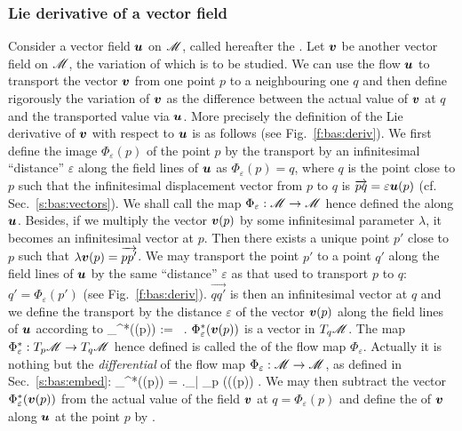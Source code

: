 \subsubsection{Lie derivative of a vector field} \label{s:bas:Lie_der_vector}

Consider a vector field $\bm{u}$ on $\mathscr{M}$, called hereafter the .
Let $\bm{v}$ be another vector field on $\mathscr{M}$, the variation of which is to be studied.
We can use the flow $\bm{u}$ to transport the vector $\bm{v}$ from one point $p$ to
a neighbouring one $q$ and then define rigorously the variation of $\bm{v}$
as the difference between the actual value of $\bm{v}$ at $q$ and the transported
value via $\bm{u}$. More precisely the definition of the Lie derivative of
$\bm{v}$ with respect to $\bm{u}$ is as follows (see Fig.~\ref{f:bas:deriv}).
We first define the image $\Phi_\varepsilon(p)$ of the point $p$ by the transport by an infinitesimal ``distance'' $\varepsilon$ along the field lines of $\bm{u}$ as
$\Phi_\varepsilon(p)=q$, where $q$ is the point close to $p$ such that
the infinitesimal displacement vector from $p$ to $q$ is
$\overrightarrow{pq}=\varepsilon\bm{u}(p)$ (cf. Sec.~\ref{s:bas:vectors}).
We shall call the map $\Phi_\varepsilon:\mathscr{M}\rightarrow \mathscr{M}$ hence defined
the  along $\bm{u}$.
Besides, if we multiply the vector $\bm{v}(p)$ by
some infinitesimal parameter $\lambda$, it becomes an infinitesimal vector at $p$.
Then there exists a unique point $p'$ close to $p$ such that
$\lambda\bm{v}(p)=\overrightarrow{pp'}$.
We may transport the point $p'$ to a point $q'$ along the field lines of
$\bm{u}$ by the same ``distance'' $\varepsilon$ as that used to transport
$p$ to $q$: $q'=\Phi_\varepsilon(p')$ (see Fig.~\ref{f:bas:deriv}). $\overrightarrow{qq'}$ is then an
infinitesimal vector at $q$ and we
define the transport by the distance $\varepsilon$ of the vector $\bm{v}(p)$
along the field lines of $\bm{u}$ according to
\be \label{e:bas:def_Phi_eps}
    \Phi_\varepsilon^*((p)) :=  \, .
\ee
$\Phi_\varepsilon^*(\bm{v}(p))$ is a vector in $T_q\mathscr{M}$.
The map $\Phi_\varepsilon^*: T_p\mathscr{M} \rightarrow T_q\mathscr{M}$
hence defined is called the 
of the flow map $\Phi_\varepsilon$. Actually it is nothing but
the \emph{differential}
of the flow map $\Phi_\varepsilon: \mathscr{M} \rightarrow \mathscr{M}$,
as defined in Sec.~\ref{s:bas:embed}:
\be
    \Phi_\varepsilon^*((p)) = \left.\D\Phi_\varepsilon \right| _p (((p)) .
\ee
We may then subtract the vector $\Phi_\varepsilon^*(\bm{v}(p))$ from the
actual value of the field $\bm{v}$ at $q=\Phi_\varepsilon(p)$ and define the 
of $\bm{v}$ along $\bm{u}$ at the point $p$ by
\be \label{e:bas:def_Lie_der}
    .
\ee

